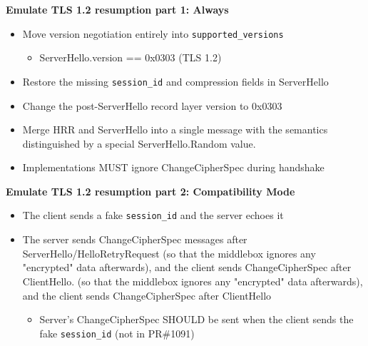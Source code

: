 \documentclass[helvetica]{seminar}
\newcommand{\heading}[1]{%
  \begin{center} 
    \large\bf 
    #1 
  \end{center} 
  \vspace{.4 in}}
\begin{document}
\begin{slide}
  \heading{Emulate TLS 1.2 resumption part 1: Always}

  \begin{itemize}
  \item Move version negotiation entirely into \verb^supported_versions^
    \begin{itemize}
    \item ServerHello.version == 0x0303 (TLS 1.2)
    \end{itemize}
  \item Restore the missing \verb^session_id^ and compression fields in ServerHello
  \item Change the post-ServerHello record layer version to 0x0303
  \item Merge HRR and ServerHello into a single message with the semantics
    distinguished by a special ServerHello.Random value.
    \item Implementations MUST ignore ChangeCipherSpec during handshake
  \end{itemize}
\end{slide}

\begin{slide}
  \heading{Emulate TLS 1.2 resumption part 2: Compatibility Mode}

  \begin{itemize}
  \item The client sends a fake \verb^session_id^ and the server echoes it
  \item The server sends ChangeCipherSpec messages after
    ServerHello/HelloRetryRequest (so that the middlebox ignores any
    "encrypted" data afterwards), and the client sends ChangeCipherSpec
    after ClientHello.  (so that the middlebox ignores any "encrypted"
    data afterwards), and the client sends ChangeCipherSpec after
    ClientHello
    \begin{itemize}
    \item Server's ChangeCipherSpec SHOULD be sent when the client sends
      the fake \verb^session_id^ (not in PR\#1091)
    \end{itemize}
  \end{itemize}
\end{slide}
\end{document}

